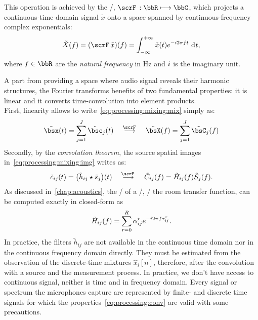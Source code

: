 This operation is achieved by the \FTdef/, $\fourierTrans{}:\bbR\kmapsto\bbC$, which projects a continuous-time-domain signal $\tilde{x}$ onto a space spanned by continuous-frequency complex exponentials:
\begin{equation}\label{eq:processing:ft}
    \tilde{X}(f) = (\fourierTrans{\tilde{x}})(f) =
        \int_{-\infty}^{+\infty}
        \tilde{x}(t)
        \cste^{-\csti 2 \pi f t}
        \,\kdiff{t}
    ,
\end{equation}
where $f \in \bbR$ are the \textit{natural frequency} in $\si{\Hz}$ and ${i}$ is the imaginary unit.


A part from providing a space where audio signal reveals their harmonic structures, the Fourier transforms benefits of two fundamental properties:
it is linear and it converts time-convolution into element products.
\\First, linearity allows to write~\cref{eq:processing:mixing:mix} simply as:
\begin{equation}\label{eq:processing:ft:mix}
    \tilde{\mics}( t) = \sum_{\idxSrc=1}^{\numSrcs} \tilde{\imgs}_\idxSrc( t)
    \mathspace\overset{\fourierTrans{}}{\kto}\mathspace
    \tilde{\MICS}( f) = \sum_{\idxSrc=1}^{\numSrcs} \tilde{\IMGS}_\idxSrc( f)
\end{equation}
Secondly, by the \textit{convolution theorem}, the source spatial images in~\cref{eq:processing:mixing:img} writes as:
\begin{equation}\label{eq:processing:conv}
    \tilde{\img}_{\idxMic\idxSrc}( t) =  \kparen{\tilde{\rir}_{\idxMic\idxSrc} \convCont \tilde{\src}_\idxSrc} ( t)
    \mathspace\overset{\fourierTrans{}}{\kto}\mathspace
    \tilde{\IMG}_{\idxMic\idxSrc}( f) =  \tilde{H}_{\idxMic\idxSrc}( f) \tilde{S}_\idxSrc( f)
    .
\end{equation}
As discussed in~\cref{chap:acoustics}, the \FT/ of a \RIR/, \aka/ the room transfer function, can be computed exactly in closed-form as
\begin{equation}\label{eq:processing:rir:ft}
    \tilde{H}_{ij}( f) = \sum_{r=0}^{R} \alpha_{ij}^r {e}^{- {i} 2 \pi f \tau_{ij}^r}
    .
\end{equation}
In practice, the filters $\tilde{h}_{ij}$ are not available in the continuous time domain nor in the continuous frequency domain directly.
They must be estimated from the observation of the discrete-time mixtures $\hat{x}_i[n]$, therefore, after the convolution with a source and the measurement process.
In practice, we don't have access to continuous signal, neither is time and in frequency domain.
Every signal or spectrum the microphones capture are represented by finite- and discrete time signals for which the properties~\eqref{eq:processing:conv} are valid with some precautions.

